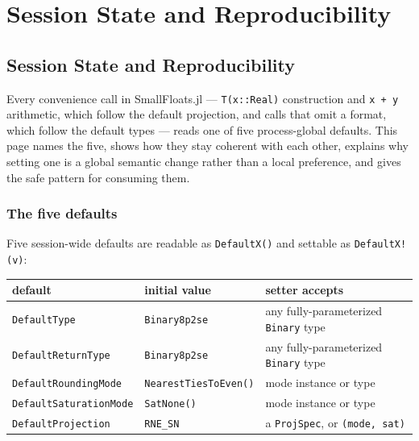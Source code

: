 \chapter{Session State and Reproducibility}


\section{Session State and Reproducibility}



\label{17629063325696993065}{}


Every convenience call in SmallFloats.jl — \texttt{T(x::Real)} construction and \texttt{x + y} arithmetic, which follow the default projection, and calls that omit a format, which follow the default types — reads one of five process-global defaults. This page names the five, shows how they stay coherent with each other, explains why setting one is a global semantic change rather than a local preference, and gives the safe pattern for consuming them.



\subsection{The five defaults}



\label{10146546853569328460}{}


Five session-wide defaults are readable as \texttt{DefaultX()} and settable as \texttt{DefaultX!(v)}:




\begin{table}[h]
\centering
\begin{tabulary}{\linewidth}{L L L}
\toprule
default & initial value & setter accepts \\
\toprule
\texttt{DefaultType} & \texttt{Binary8p2se} & any fully-parameterized \texttt{Binary} type \\
\texttt{DefaultReturnType} & \texttt{Binary8p2se} & any fully-parameterized \texttt{Binary} type \\
\texttt{DefaultRoundingMode} & \texttt{NearestTiesToEven()} & mode instance or type \\
\texttt{DefaultSaturationMode} & \texttt{SatNone()} & mode instance or type \\
\texttt{DefaultProjection} & \texttt{RNE\_\allowbreak{}SN} & a \texttt{ProjSpec}, or \texttt{(mode, sat)} \\
\bottomrule
\end{tabulary}

\end{table}



